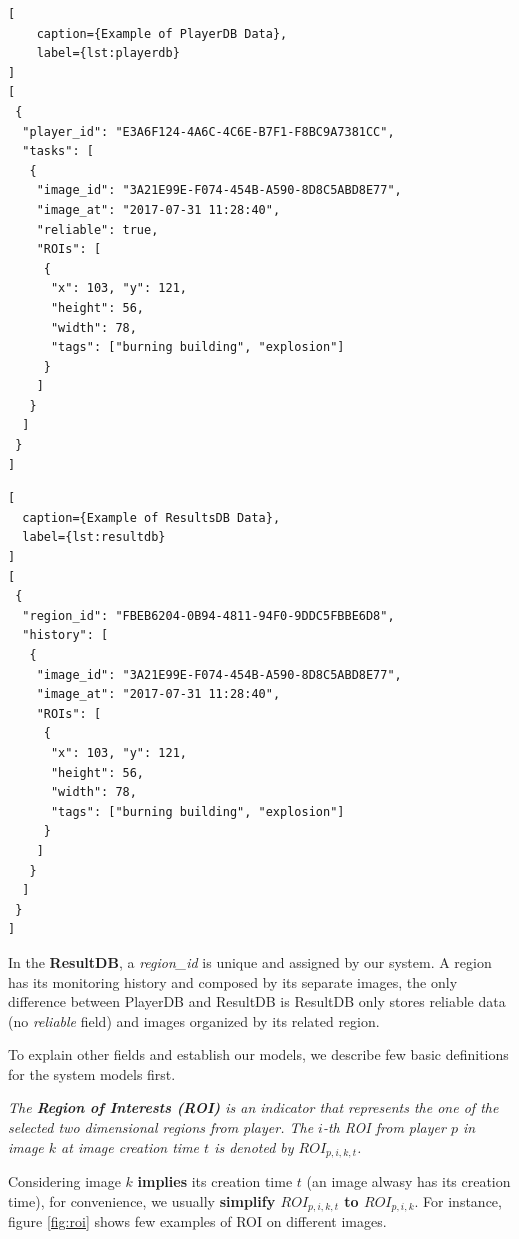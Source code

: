 \noindent\begin{minipage}{.45\textwidth}
\begin{lstlisting}[
    caption={Example of PlayerDB Data},
    label={lst:playerdb}
]
[
 {
  "player_id": "E3A6F124-4A6C-4C6E-B7F1-F8BC9A7381CC",
  "tasks": [
   {
    "image_id": "3A21E99E-F074-454B-A590-8D8C5ABD8E77",
    "image_at": "2017-07-31 11:28:40",
    "reliable": true,
    "ROIs": [
     {
      "x": 103, "y": 121,
      "height": 56,
      "width": 78,
      "tags": ["burning building", "explosion"]
     }
    ]
   }
  ]
 }
]
\end{lstlisting}
\end{minipage}\hfill
\begin{minipage}{.45\textwidth}
\begin{lstlisting}[
  caption={Example of ResultsDB Data},
  label={lst:resultdb}
]
[
 {
  "region_id": "FBEB6204-0B94-4811-94F0-9DDC5FBBE6D8",
  "history": [
   {
    "image_id": "3A21E99E-F074-454B-A590-8D8C5ABD8E77",
    "image_at": "2017-07-31 11:28:40",
    "ROIs": [
     {
      "x": 103, "y": 121,
      "height": 56,
      "width": 78,
      "tags": ["burning building", "explosion"]
     }
    ]
   }
  ]
 }
]
\end{lstlisting}
\end{minipage}

In the \textbf{ResultDB}, a \emph{region\_id} is unique and assigned by our system. A region has its
monitoring history and composed by its separate images, the only difference between PlayerDB and ResultDB is
ResultDB only stores reliable data (no \emph{reliable} field) and images organized by its related region.

To explain other fields and establish our models, we describe few basic definitions for the system models first.

\begin{definition}
\label{def:roi}
\emph{The \textbf{Region of Interests (ROI)} is an indicator that represents the one of the selected two dimensional regions from player. 
The $i$-th ROI from player $p$ in image $k$ at image creation time $t$ is denoted by $ROI_{p,i,k,t}$.}
\end{definition}

Considering image $k$ \textbf{implies} its creation time $t$ (an image alwasy has its creation time), for convenience, 
we usually \textbf{simplify $ROI_{p,i,k,t}$ to $ROI_{p,i,k}$}.
For instance, figure \ref{fig:roi} shows few examples of ROI on different images.

